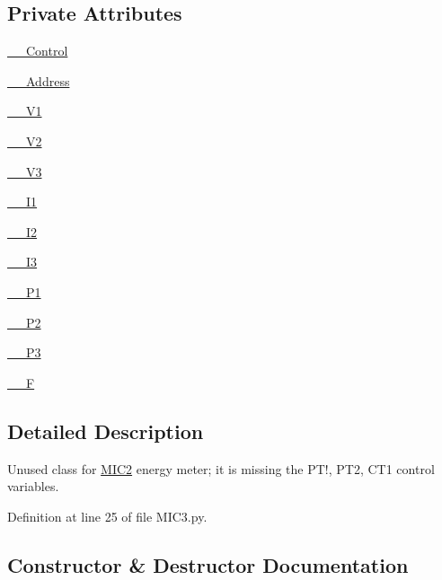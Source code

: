 \subsection*{Private Attributes}
\begin{DoxyCompactItemize}
\item 
\hyperlink{class_m_i_c3_1_1_m_i_c2_afc569cfb2ed2703bf1d6c6e0c7ba26ba}{\+\_\+\+\_\+\+Control}
\item 
\hyperlink{class_m_i_c3_1_1_m_i_c2_a7f0c5c34946f815efc1c4b3befdf3cca}{\+\_\+\+\_\+\+Address}
\item 
\hyperlink{class_m_i_c3_1_1_m_i_c2_a308673703d47470ffa470ef7038cf6d3}{\+\_\+\+\_\+\+V1}
\item 
\hyperlink{class_m_i_c3_1_1_m_i_c2_a62869229c9de79f24a61d8a1043256e6}{\+\_\+\+\_\+\+V2}
\item 
\hyperlink{class_m_i_c3_1_1_m_i_c2_aa35ac9a7cf922516057a46c213685997}{\+\_\+\+\_\+\+V3}
\item 
\hyperlink{class_m_i_c3_1_1_m_i_c2_a74b954717f248d73546151a9166a5be0}{\+\_\+\+\_\+\+I1}
\item 
\hyperlink{class_m_i_c3_1_1_m_i_c2_a2064b33aac2b5b381773b402844bc1c9}{\+\_\+\+\_\+\+I2}
\item 
\hyperlink{class_m_i_c3_1_1_m_i_c2_acf85310ab7fbbcd0cc6ff324b3bca413}{\+\_\+\+\_\+\+I3}
\item 
\hyperlink{class_m_i_c3_1_1_m_i_c2_a12cf23df00894de4d94cbb1d03e36479}{\+\_\+\+\_\+\+P1}
\item 
\hyperlink{class_m_i_c3_1_1_m_i_c2_a5f62cbed2b0b741f6e0f19ae35b12a0c}{\+\_\+\+\_\+\+P2}
\item 
\hyperlink{class_m_i_c3_1_1_m_i_c2_a3f20e10a3906e6928e59d63c99c06268}{\+\_\+\+\_\+\+P3}
\item 
\hyperlink{class_m_i_c3_1_1_m_i_c2_af4f02067aa2b0631aa7fbe60406a86cf}{\+\_\+\+\_\+F}
\end{DoxyCompactItemize}


\subsection{Detailed Description}
Unused class for \hyperlink{class_m_i_c3_1_1_m_i_c2}{M\+I\+C2} energy meter; it is missing the P\+T!, P\+T2, C\+T1 control variables. 

Definition at line 25 of file M\+I\+C3.\+py.



\subsection{Constructor \& Destructor Documentation}
\mbox{\label{class_m_i_c3_1_1_m_i_c2_a4db1a4c2894be1d777ab454027cade4a}} 
